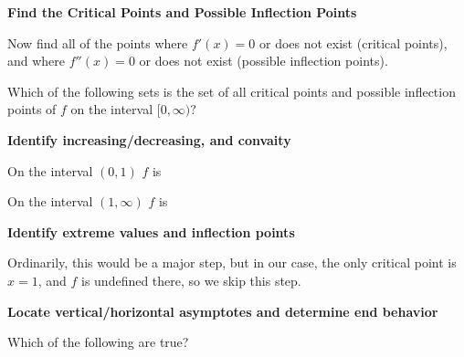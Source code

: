 \documentclass{ximera}
\begin{document}
\begin{question}
 \textbf{Find the Critical Points and Possible Inflection Points}
 
 \begin{solution}
	Now find all of the points where $f'(x)=0$ or does not exist (critical points), and where $f''(x)=0$ or does not exist (possible inflection points).
	
	Which of the following sets is the set of all critical points and possible inflection points of $f$ on the interval $[0,\infty)$?
	
	 \begin{multipleChoice}
    \end{multipleChoice}

 \end{solution}
 
 \textbf{Identify increasing/decreasing, and convaity}
 
 On the interval $(0,1)$ $f$ is
 
  \begin{multipleChoice}
    \end{multipleChoice}
    
  On the interval $(1,\infty)$ $f$ is
 
  \begin{multipleChoice}
    \end{multipleChoice}
    
 \textbf{Identify extreme values and inflection points}
 
 Ordinarily, this would be a major step, but in our case, the only critical point is $x=1$, and $f$ is undefined there, so we skip this step.
 
 \textbf{Locate vertical/horizontal asymptotes and determine end behavior}
 
 Which of the following are true?
 
 \begin{multipleChoice}
    \end{multipleChoice}
    

\end{question}
\end{document}
